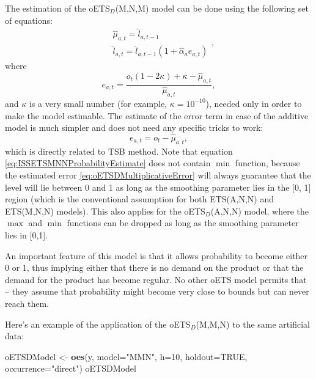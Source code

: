 \documentclass[]{book}
\newenvironment{Shaded}{\begin{snugshade}}{\end{snugshade}}
\newcommand{\DataTypeTok}[1]{\textcolor[rgb]{0.13,0.29,0.53}{#1}}
\newcommand{\DecValTok}[1]{\textcolor[rgb]{0.00,0.00,0.81}{#1}}
\newcommand{\KeywordTok}[1]{\textcolor[rgb]{0.13,0.29,0.53}{\textbf{#1}}}
\newcommand{\NormalTok}[1]{#1}
\newcommand{\OtherTok}[1]{\textcolor[rgb]{0.56,0.35,0.01}{#1}}
\newcommand{\StringTok}[1]{\textcolor[rgb]{0.31,0.60,0.02}{#1}}
\theoremstyle{definition}
\theoremstyle{definition}
\theoremstyle{definition}
\theoremstyle{definition}
\theoremstyle{remark}
\begin{document}
The estimation of the oETS\(_D\)(M,N,M) model can be done using the following set of equations:
\begin{equation}
\begin{aligned}
& \hat{\mu}_{a,t} = \hat{l}_{a,t-1} \\
& \hat{l}_{a,t} = \hat{l}_{a,t-1}( 1  + \hat{\alpha}_{a} e_{a,t})
\end{aligned},
\label{eq:ISSETSMNNProbabilityEstimate}
\end{equation}
where
\begin{equation}
e_{a,t} = \frac{o_t (1 -2 \kappa) + \kappa -\hat{\mu}_{a,t}}{\hat{\mu}_{a,t}},
\label{eq:oETSDMultiplicativeError}
\end{equation}
and \(\kappa\) is a very small number (for example, \(\kappa = 10^{-10}\)), needed only in order to make the model estimable. The estimate of the error term in case of the additive model is much simpler and does not need any specific tricks to work:
\begin{equation}
e_{a,t} = o_t -\hat{\mu}_{a,t} ,
\label{eq:oETSDAdditiveError}
\end{equation}
which is directly related to TSB method. Note that equation \eqref{eq:ISSETSMNNProbabilityEstimate} does not contain \(\min\) function, because the estimated error \eqref{eq:oETSDMultiplicativeError} will always guarantee that the level will lie between 0 and 1 as long as the smoothing parameter lies in the {[}0, 1{]} region (which is the conventional assumption for both ETS(A,N,N) and ETS(M,N,N) models). This also applies for the oETS\(_D\)(A,N,N) model, where the \(\max\) and \(\min\) functions can be dropped as long as the smoothing parameter lies in {[}0,1{]}.

An important feature of this model is that it allows probability to become either 0 or 1, thus implying either that there is no demand on the product or that the demand for the product has become regular. No other oETS model permits that -- they assume that probability might become very close to bounds but can never reach them.

Here's an example of the application of the oETS\(_D\)(M,M,N) to the same artificial data:

\begin{Shaded}
\begin{Highlighting}[]
\NormalTok{oETSDModel <-}\StringTok{ }\KeywordTok{oes}\NormalTok{(y, }\DataTypeTok{model=}\StringTok{"MMN"}\NormalTok{, }\DataTypeTok{h=}\DecValTok{10}\NormalTok{, }\DataTypeTok{holdout=}\OtherTok{TRUE}\NormalTok{,}
                  \DataTypeTok{occurrence=}\StringTok{"direct"}\NormalTok{)}
\NormalTok{oETSDModel}
\end{Highlighting}
\end{Shaded}
\end{document}
